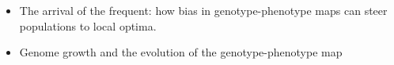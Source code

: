 \begin{itemize}
  \item The arrival of the frequent: how bias in genotype-phenotype maps can steer populations to local optima.
  \item Genome growth and the evolution of the genotype-phenotype map
\end{itemize}
